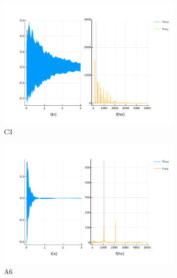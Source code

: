 \documentclass[12pt]{article}
\begin{document}
\begin{figure}[!ht]
	\centering
	\begin{subfigure}{.5\textwidth}
		\centering
		\includegraphics[width=1.0\linewidth]{assets/C3.pdf}
		\caption{C3}
		\label{fig:c3}
	\end{subfigure}%
	\begin{subfigure}{.5\textwidth}
		\centering
		\includegraphics[width=1.0\linewidth]{assets/C6.pdf}
		\caption{A6}
		\label{fig:c6}
	\end{subfigure}
	\caption{}
\end{figure}
\end{document}
